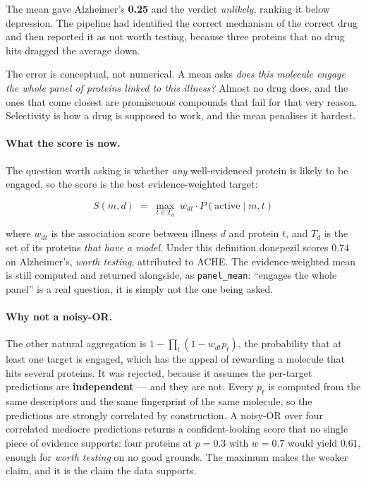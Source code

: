 The mean gave Alzheimer's \textbf{0.25} and the verdict \emph{unlikely}, ranking it below
depression. The pipeline had identified the correct mechanism of the correct drug and then
reported it as not worth testing, because three proteins that no drug hits dragged the average
down.

The error is conceptual, not numerical. A mean asks \emph{does this molecule engage the whole
panel of proteins linked to this illness?} Almost no drug does, and the ones that come closest
are promiscuous compounds that fail for that very reason. Selectivity is how a drug is supposed
to work, and the mean penalises it hardest.

\paragraph{What the score is now.} The question worth asking is whether \emph{any} well-evidenced
protein is likely to be engaged, so the score is the best evidence-weighted target:

\begin{equation}
  S(m, d) \;=\; \max_{t \in T_d} \; w_{dt} \cdot P(\text{active} \mid m, t)
  \label{eq:illness-score}
\end{equation}

where $w_{dt}$ is the association score between illness $d$ and protein $t$, and $T_d$ is the set
of its proteins \emph{that have a model}. Under this definition donepezil scores $0.74$ on
Alzheimer's, \emph{worth testing}, attributed to ACHE. The evidence-weighted mean is still
computed and returned alongside, as \texttt{panel\_mean}: ``engages the whole panel'' is a real
question, it is simply not the one being asked.

\paragraph{Why not a noisy-OR.} The other natural aggregation is
$1 - \prod_t (1 - w_{dt} p_t)$, the probability that at least one target is engaged, which has the
appeal of rewarding a molecule that hits several proteins. It was rejected, because it assumes the
per-target predictions are \textbf{independent} --- and they are not. Every $p_t$ is computed from
the same descriptors and the same fingerprint of the same molecule, so the predictions are
strongly correlated by construction. A noisy-OR over four correlated mediocre predictions returns
a confident-looking score that no single piece of evidence supports: four proteins at $p = 0.3$
with $w = 0.7$ would yield $0.61$, enough for \emph{worth testing} on no good grounds. The maximum
makes the weaker claim, and it is the claim the data supports.


